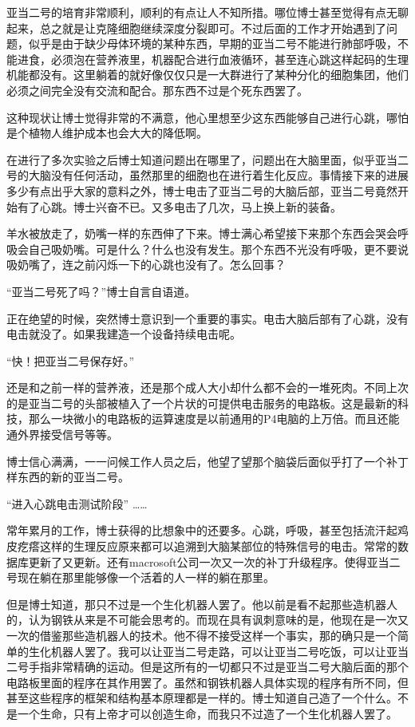 \documentclass[11pt,oneside]{article}
\begin{document}
亚当二号的培育非常顺利，顺利的有点让人不知所措。哪位博士甚至觉得有点无聊起来，总之就是让克隆细胞继续深度分裂即可。不过后面的工作才开始遇到了问题，似乎是由于缺少母体环境的某种东西，早期的亚当二号不能进行肺部呼吸，不能进食，必须泡在营养液里，机器配合进行血液循环，甚至连心跳这样起码的生理机能都没有。这里躺着的就好像仅仅只是一大群进行了某种分化的细胞集团，他们必须之间完全没有交流和配合。那东西不过是个死东西罢了。

这种现状让博士觉得非常的不满意，他心里想至少这东西能够自己进行心跳，哪怕是个植物人维护成本也会大大的降低啊。

在进行了多次实验之后博士知道问题出在哪里了，问题出在大脑里面，似乎亚当二号的大脑没有任何活动，虽然那里的细胞也在进行着生化反应。事情接下来的进展多少有点出乎大家的意料之外，博士电击了亚当二号的大脑后部，亚当二号竟然开始有了心跳。博士兴奋不已。又多电击了几次，马上换上新的装备。

羊水被放走了，奶嘴一样的东西伸了下来。博士满心希望接下来那个东西会哭会呼吸会自己吸奶嘴。可是什么？什么也没有发生。那个东西不光没有呼吸，更不要说吸奶嘴了，连之前闪烁一下的心跳也没有了。怎么回事？

“亚当二号死了吗？”博士自言自语道。

正在绝望的时候，突然博士意识到一个重要的事实。电击大脑后部有了心跳，没有电击就没了。如果我建造一个设备持续电击呢。

“快！把亚当二号保存好。”

还是和之前一样的营养液，还是那个成人大小却什么都不会的一堆死肉。不同上次的是亚当二号的头部被植入了一个片状的可提供电击服务的电路板。这是最新的科技，那么一块微小的电路板的运算速度是以前通用的P4电脑的上万倍。而且还能通外界接受信号等等。

博士信心满满，一一问候工作人员之后，他望了望那个脑袋后面似乎打了一个补丁样东西的新的亚当二号。

“进入心跳电击测试阶段”
\ldots{}\ldots{}

常年累月的工作，博士获得的比想象中的还要多。心跳，呼吸，甚至包括流汗起鸡皮疙瘩这样的生理反应原来都可以追溯到大脑某部位的特殊信号的电击。常常的数据库更新了又更新。还有macrosoft公司一次又一次的补丁升级程序。使得亚当二号现在躺在那里能够像一个活着的人一样的躺在那里。

但是博士知道，那只不过是一个生化机器人罢了。他以前是看不起那些造机器人的，认为钢铁从来是不可能会思考的。而现在具有讽刺意味的是，他现在是一次又一次的借鉴那些造机器人的技术。他不得不接受这样一个事实，那的确只是一个简单的生化机器人罢了。我可以让亚当二号走路，可以让亚当二号吃饭，可以让亚当二号手指非常精确的运动。但是这所有的一切都只不过是亚当二号大脑后面的那个电路板里面的程序在其作用罢了。虽然和钢铁机器人具体实现的程序有所不同，但甚至这些程序的框架和结构基本原理都是一样的。博士知道自己造了一个什么。不是一个生命，只有上帝才可以创造生命，而我只不过造了一个生化机器人罢了。
\end{document}
